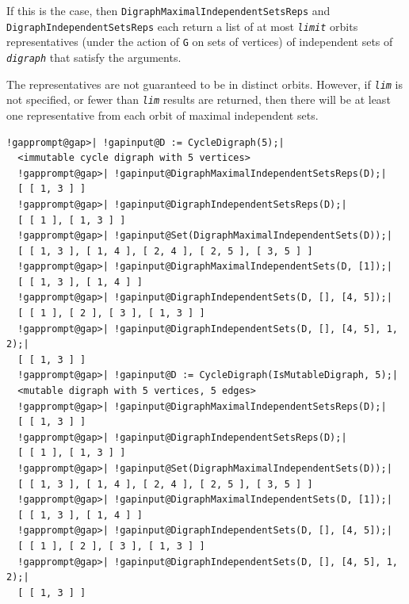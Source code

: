 \documentclass[a4paper,11pt]{report}
\begin{document}
{{{\begin{description}
 If this is the case, then \texttt{DigraphMaximalIndependentSetsReps} and \texttt{DigraphIndependentSetsReps} each return a list of at most \mbox{\texttt{\mdseries\slshape limit}} orbits representatives (under the action of \texttt{G} on sets of vertices) of independent sets of \mbox{\texttt{\mdseries\slshape digraph}} that satisfy the arguments. 

 The representatives are not guaranteed to be in distinct orbits. However, if \mbox{\texttt{\mdseries\slshape lim}} is not specified, or fewer than \mbox{\texttt{\mdseries\slshape lim}} results are returned, then there will be at least one representative from each
orbit of maximal independent sets. 
\end{description}
 
\begin{Verbatim}[commandchars=!@|,fontsize=\small,frame=single,label=Example]
  !gapprompt@gap>| !gapinput@D := CycleDigraph(5);|
  <immutable cycle digraph with 5 vertices>
  !gapprompt@gap>| !gapinput@DigraphMaximalIndependentSetsReps(D);|
  [ [ 1, 3 ] ]
  !gapprompt@gap>| !gapinput@DigraphIndependentSetsReps(D);|
  [ [ 1 ], [ 1, 3 ] ]
  !gapprompt@gap>| !gapinput@Set(DigraphMaximalIndependentSets(D));|
  [ [ 1, 3 ], [ 1, 4 ], [ 2, 4 ], [ 2, 5 ], [ 3, 5 ] ]
  !gapprompt@gap>| !gapinput@DigraphMaximalIndependentSets(D, [1]);|
  [ [ 1, 3 ], [ 1, 4 ] ]
  !gapprompt@gap>| !gapinput@DigraphIndependentSets(D, [], [4, 5]);|
  [ [ 1 ], [ 2 ], [ 3 ], [ 1, 3 ] ]
  !gapprompt@gap>| !gapinput@DigraphIndependentSets(D, [], [4, 5], 1, 2);|
  [ [ 1, 3 ] ]
  !gapprompt@gap>| !gapinput@D := CycleDigraph(IsMutableDigraph, 5);|
  <mutable digraph with 5 vertices, 5 edges>
  !gapprompt@gap>| !gapinput@DigraphMaximalIndependentSetsReps(D);|
  [ [ 1, 3 ] ]
  !gapprompt@gap>| !gapinput@DigraphIndependentSetsReps(D);|
  [ [ 1 ], [ 1, 3 ] ]
  !gapprompt@gap>| !gapinput@Set(DigraphMaximalIndependentSets(D));|
  [ [ 1, 3 ], [ 1, 4 ], [ 2, 4 ], [ 2, 5 ], [ 3, 5 ] ]
  !gapprompt@gap>| !gapinput@DigraphMaximalIndependentSets(D, [1]);|
  [ [ 1, 3 ], [ 1, 4 ] ]
  !gapprompt@gap>| !gapinput@DigraphIndependentSets(D, [], [4, 5]);|
  [ [ 1 ], [ 2 ], [ 3 ], [ 1, 3 ] ]
  !gapprompt@gap>| !gapinput@DigraphIndependentSets(D, [], [4, 5], 1, 2);|
  [ [ 1, 3 ] ]
\end{Verbatim}
 }

 }

 }

 
\end{document}
